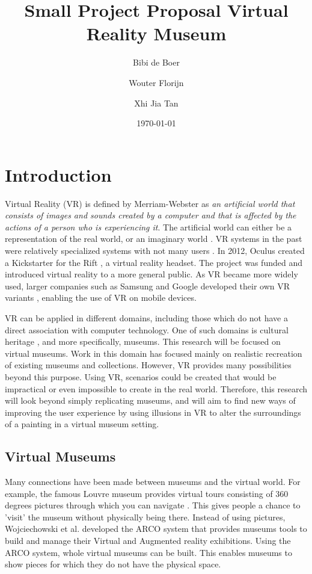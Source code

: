 \documentclass[a4paper]{article}
\title{Small Project Proposal Virtual Reality Museum}
\author{Bibi de Boer \and Wouter Florijn \and Xhi Jia Tan}
\date{\today}
\begin{document}
\maketitle



\section{Introduction}

Virtual Reality (VR) is defined by Merriam-Webster \cite{merriam} as \emph{an artificial world that consists of images and sounds created by a computer and that is affected by the actions of a person who is experiencing it}. The artificial world can either be a representation of the real world, or an imaginary world \cite{martens}. VR systems in the past were relatively specialized systems with not many users \cite{martens}. In 2012, Oculus created a Kickstarter \cite{kickstarter} for the Rift \cite{oculus}, a virtual reality headset. The project was funded and  introduced virtual reality to a more general public. As VR became more widely used, larger companies such as Samsung and Google developed their own VR variants \cite{gearvr, cardboard}, enabling the use of VR on mobile devices. 

VR can be applied in different domains, including those which do not have a direct association with computer technology. One of such domains is cultural heritage \cite{wojciechowski}, and more specifically, museums. This research will be focused on virtual museums. Work in this domain has focused mainly on realistic recreation of existing museums and collections. However, VR provides many possibilities beyond this purpose. Using VR, scenarios could be created that would be impractical or even impossible to create in the real world. Therefore, this research will look beyond simply replicating museums, and will aim to find new ways of improving the user experience by using illusions in VR to alter the surroundings of a painting in a virtual museum setting.


\subsection{Virtual Museums}
Many connections have been made between museums and the virtual  world. For example, the famous Louvre museum provides virtual tours consisting of 360 degrees pictures through which you can navigate \cite{louvre}. This gives people a chance to 'visit' the museum without physically being there. Instead of using pictures, Wojciechowski et al. \cite{wojciechowski} developed the ARCO system that provides museums tools to build and manage their Virtual and Augmented reality exhibitions. Using the ARCO system, whole virtual museums can be built. This enables museums to show pieces for which they do not have the physical space. 
\end{document}
